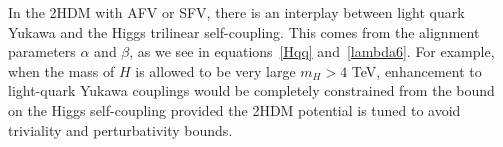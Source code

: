In the 2HDM with AFV or SFV, there is an interplay between light quark Yukawa and the Higgs trilinear self-coupling. This comes from the alignment parameters $\alpha$ and $\beta$, as we see in equations~\eqref{Hqq} and~\eqref{lambda6}. For example, when the mass of $H$ is allowed to be very large $m_H >4$ TeV, enhancement to light-quark Yukawa couplings would be completely constrained from the bound on the Higgs self-coupling provided the 2HDM potential is tuned to avoid triviality and perturbativity bounds. 





